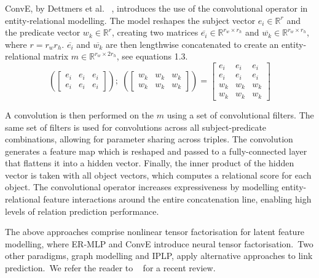 \noindent ConvE, by Dettmers et al. \unskip~\citep{dettmers2018convolutional}, introduces the use of the convolutional operator in entity-relational modelling. The model reshapes the subject vector $ e_i \in \mathbb{R}^{r} $ and the predicate vector $ w_k \in \mathbb{R}^{r} $, creating two matrices $ \overline{e_i} \in \mathbb{R}^{r_w \times r_h} $ and $ \overline{w_k} \in \mathbb{R}^{r_w \times r_h} $, where $ r = r_wr_h $. $ \overline{e_i} $ and $ \overline{w_k} $ are then lengthwise concatenated to create an entity-relational matrix $ m \in \mathbb{R}^{r_w \times 2r_h} $, see equations 1.3.
\begin{equation}
	(\begin{bmatrix}
        		e_i & e_i & e_i \\
           	e_i & e_i & e_i 
       	\end{bmatrix}); \; (\begin{bmatrix}
        					w_k & w_k & w_k \\
           	                         w_k & w_k & w_k 
       				\end{bmatrix}) = \begin{bmatrix}
        								e_i & e_i & e_i \\
           	                                                  e_i & e_i & e_i \\
           							w_k & w_k & w_k \\
           	                                                  w_k & w_k & w_k 
        			     				\end{bmatrix}
\end{equation}

\noindent A convolution is then performed on the $ m $ using a set of convolutional filters. The same set of filters is used for convolutions across all subject-predicate combinations, allowing for parameter sharing across triples. The convolution generates a feature map which is reshaped and passed to a fully-connected layer that flattens it into a hidden vector. Finally, the inner product of the hidden vector is taken with all object vectors, which computes a relational score for each object. The convolutional operator increases expressiveness by modelling entity-relational feature interactions around the entire concatenation line, enabling high levels of relation prediction performance. \par

\noindent The above approaches comprise nonlinear tensor factorisation for latent feature modelling, where ER-MLP and ConvE introduce neural tensor factorisation.\ Two other paradigms, graph modelling and IPLP, apply alternative approaches to link prediction.\ We refer the reader to \unskip~\citep{nickel2015review} for a recent review. \par


